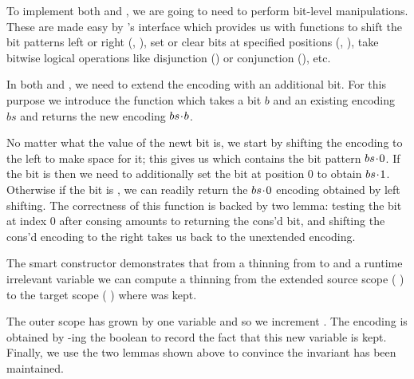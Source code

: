 
To implement both  and , we are going to need
to perform bit-level manipulations.
%
These are made easy by \idris{}'s  interface which provides us with
functions to
shift the bit patterns left or right (, ),
set or clear bits at specified positions (, ),
take bitwise logical operations like disjunction ()
or conjunction (), etc.


In both   and , we need to extend the
encoding with an additional bit.
%
For this purpose we introduce the  function which takes a bit
$b$ and an existing encoding $bs$ and returns the new encoding $bs\!\cdot{}\!b$.


No matter what the value of the newt bit is, we start by shifting the encoding to
the left to make space for it; this gives us  which contains the
bit pattern $bs\!\cdot{}\!0$.
%
If the bit is  then we need to additionally set the bit at position
$0$ to obtain $bs\!\cdot{}\!1$. Otherwise if the bit is , we can readily
return the $bs\!\cdot{}\!0$ encoding obtained by left shifting.
%
The correctness of this function is backed by two lemma:
testing the bit at index $0$ after consing amounts to returning the cons'd bit,
and shifting the cons'd encoding to the right takes us back to the unextended
encoding.


The  smart constructor demonstrates that from a thinning from
 to  and a runtime irrelevant variable 
we can compute a thinning from the extended source scope
( \IdrisData{:<} ) to the target scope
( \IdrisData{:<} ) where  was kept.


The outer scope has grown by one variable and so we increment .
%
The encoding is obtained by -ing the boolean  to
record the fact that this new variable is kept.
%
Finally, we use the two lemmas shown above to convince \idris{} the invariant
has been maintained.

